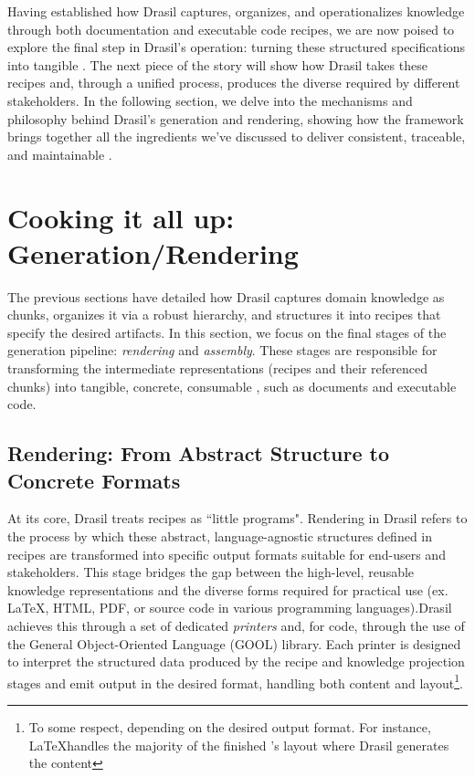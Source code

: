 Having established how Drasil captures, organizes, and operationalizes 
knowledge through both documentation and executable code recipes, we are now 
poised to explore the final step in Drasil's operation: turning these 
structured specifications into tangible \sfs{}. The next piece of the story 
will show how Drasil takes these recipes and, through a unified process, 
produces the diverse \sfs{} required by different stakeholders. In the 
following section, we delve into the mechanisms and philosophy behind Drasil's 
generation and rendering, showing how the framework brings together all the 
ingredients we've discussed to deliver consistent, traceable, and maintainable 
\sfs{}.

\section{Cooking it all up: Generation/Rendering}
\label{sec:gen}

The previous sections have detailed how Drasil captures domain knowledge as 
chunks, organizes it via a robust hierarchy, and structures it into recipes 
that specify the desired artifacts. In this section, we focus on the final 
stages of the generation pipeline: \emph{rendering} and \emph{assembly}. These 
stages are responsible for transforming the intermediate representations 
(recipes and their referenced chunks) into tangible, concrete, consumable 
\sfs{}, such as documents and executable code.

\subsection{Rendering: From Abstract Structure to Concrete Formats}

At its core, Drasil treats recipes as ``little programs". Rendering in Drasil 
refers to the process by which these abstract, language-agnostic structures 
defined in recipes are transformed into specific output formats suitable for 
end-users and stakeholders. This stage bridges the gap between the high-level, 
reusable knowledge representations and the diverse forms required for practical 
use (ex. \LaTeX{}, HTML, PDF, or source code in various programming 
languages).Drasil achieves this through a set of dedicated \emph{printers} and, 
for code, through the use of the General Object-Oriented Language 
(GOOL)\cite{??} library. Each printer is designed to interpret the structured 
data produced by the recipe and knowledge projection stages and emit output in 
the desired format, handling both content and layout\footnote{To some respect, 
depending on the desired output format. For instance, \LaTeX handles the 
majority of the finished \sf{}'s layout where Drasil generates the content}.

